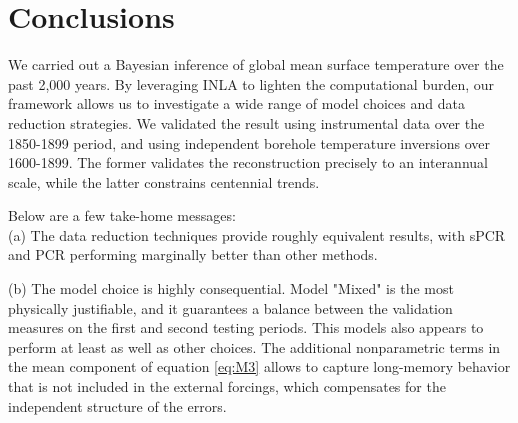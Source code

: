\documentclass[12pt]{amsart}
\theoremstyle{plain}
\theoremstyle{definition}
\theoremstyle{remark}
\begin{document}



\section{Conclusions}
We carried out a Bayesian inference of global mean surface temperature over
the past 2,000 years. By leveraging INLA to lighten the computational burden, our framework allows us to investigate a wide range of model choices and data reduction strategies.  We validated the result using instrumental data over the 1850-1899 period, and using independent borehole temperature inversions over 1600-1899. The former validates the reconstruction precisely to an interannual scale, while the latter constrains centennial trends.  

Below are a few take-home messages:\\
     (a) The data reduction techniques provide roughly equivalent results, with
      sPCR and PCR performing marginally better than other methods.
    
     \noindent (b) The model choice is highly consequential. Model "Mixed" is the most
      physically justifiable, and it guarantees a balance between the
      validation measures on the first and second testing periods. This models also
      appears to perform at least as well as other choices. The 
      additional nonparametric terms in the mean component of equation \eqref{eq:M3} allows
      to capture long-memory behavior that is not included in the external forcings, which compensates for the independent structure of the errors. 
      
\end{document}
